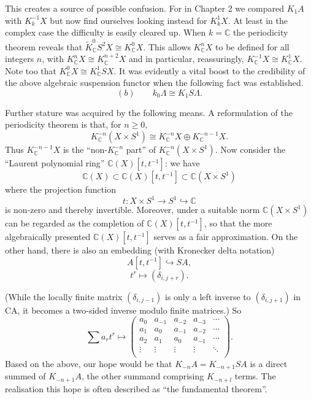 This creates a source of possible confusion. For in Chapter 2 we compared $K_1 A$ with $K^{-1}_k X$ but now find ourselves looking instead for $K^1_kX$. At least in the complex case the difficulty is easily cleared up. When $k = \mathbb{C}$ the periodicity theorem reveals that $\widetilde{K}_{\mathbb{C}}^0 S^2X \cong K^0_\mathbb{C} X$. This allows
$K^n_\mathbb{C} X$ to be defined for all integers $n$, with $K^n_\mathbb{C} X \cong K^{n+2}_\mathbb{C} X$ and in particular, reassuringly,
$K^{-1}_\mathbb{C} X \cong K^{1}_\mathbb{C} X$. Note too that $K^0_\mathbb{C} X \cong K^{1}_\mathbb{C} SX$. It was evidently a vital boost to the credibility of the above algebraic suspension functor when the following fact was established.
\begin{equation}
(b) \quad \quad  k_0\Lambda\cong K_1 S\Lambda.
\end{equation}

Further stature was acquired by the following means. A reformulation of the periodicity theorem is that, for $n \geqslant 0$,
\[K_\mathbb{C}^{-n}(X\times S^1)\cong K_\mathbb{C}^{-n}X\oplus K_\mathbb{C}^{-n-1}X.\]
Thus $K_\mathbb{C}^{-n-1}X$ is the ``non-$K_\mathbb{C}^{-n}$ part'' of $K_\mathbb{C}^{-n}(X\times S^1)$. Now consider the ``Laurent polynomial ring''  $\mathbb{C}(X)[t, t^{-1}]$: we have
\[\mathbb{C}(X)\subset \mathbb{C}(X)[t,t^{-1}]\subset \mathbb{C}(X\times S^1)\]
where the projection function
\[t\colon  X \times S^1 \longrightarrow S^1 \hookrightarrow \mathbb{C}\]
is non-zero and thereby invertible. Moreover, under a suitable norm $\mathbb{C}(X \times S^1)$ can be regarded as the completion of $\mathbb{C}(X)[t, t^{-1}]$, so that the more algebraically presented $\mathbb{C}(X)[t, t^{-1}]$ serves as a fair approximation. On the other hand, there is also an embedding (with Kronecker delta notation)
\[A[t, t^{-1}]\hookrightarrow SA, \]
\[t^r\mapsto (\delta_{i,j+r}). \]

(While the locally finite matrix $(\delta_{i,j-1})$ is only a left inverse to $(\delta_{i,j+1})$ in CA, it becomes a two-sided inverse modulo finite matrices.) So
\[\sum a_r t^r \mapsto \begin{pmatrix}
a_0 & a_{-1} &a_{-2} &a_{-3}& \cdots \\
a_1 & a_{0} &a_{-1} &a_{-2}& \cdots \\
a_2 & a_{1} &a_{0} &a_{-1}& \cdots \\
\vdots & \vdots &\vdots &\vdots &\ddots\\
\end{pmatrix}.\]
Based on the above, our hope would be that $K_{-n}A = K_{-n+1} SA$ is a direct summed of $K_{-n+1} A$, the other summand comprising $K_{-n+l}$ terms. The realisation this hope is often described as ``the fundamental theorem''.

